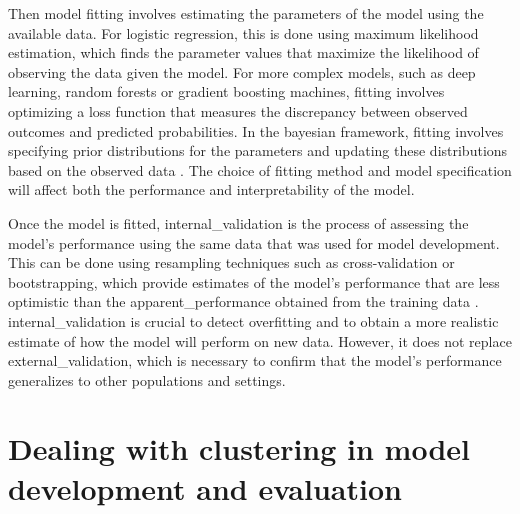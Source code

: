 Then model fitting involves estimating the parameters of the model using the available data. For logistic regression, this is done using maximum likelihood estimation, which finds the parameter values that maximize the likelihood of observing the data given the model. For more complex models, such as deep learning, random forests or gradient boosting machines, fitting involves optimizing a loss function that measures the discrepancy between observed outcomes and predicted probabilities. In the bayesian framework, fitting involves specifying prior distributions for the parameters and updating these distributions based on the observed data \cite{vandeschootBayesianStatisticsModelling2021}. The choice of fitting method and model specification will affect both the performance and interpretability of the model.

Once the model is fitted, \gls{internal_validation} is the process of assessing the model's performance using the same data that was used for model development. This can be done using resampling techniques such as cross-validation or bootstrapping, which provide estimates of the model's performance that are less optimistic than the \gls{apparent_performance} obtained from the training data \cite{efthimiou_developing_2024,collinsEvaluationClinicalPrediction2024, dehondPerspectivesValidationClinical2023}. \Gls{internal_validation} is crucial to detect \gls{overfitting} and to obtain a more realistic estimate of how the model will perform on new data. However, it does not replace \gls{external_validation}, which is necessary to confirm that the model's performance generalizes to other populations and settings.

\section[Clustering in model development and evaluation]{Dealing with clustering in model development and evaluation}

